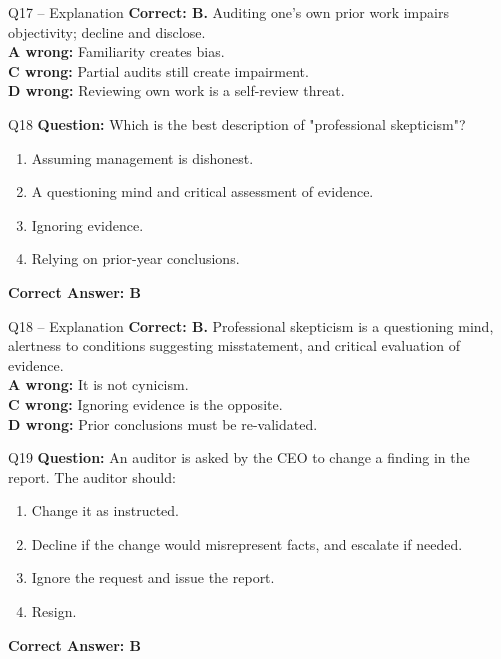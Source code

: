 \documentclass[aspectratio=169,10pt]{beamer}
\begin{document}
	\begin{frame}[t]{Q17 -- Explanation}
		\small
		\textbf{Correct: B.} Auditing one's own prior work impairs objectivity; decline and disclose. \\[4pt]
		\textbf{A wrong:} Familiarity creates bias. \\[2pt]
		\textbf{C wrong:} Partial audits still create impairment. \\[2pt]
		\textbf{D wrong:} Reviewing own work is a self-review threat.
	\end{frame}
	
	\begin{frame}[t]{Q18}
		\small
		\textbf{Question:} Which is the best description of "professional skepticism"?
		\begin{enumerate}[label=\Alph*.,itemsep=1pt,topsep=2pt]
			\item Assuming management is dishonest.
			\item A questioning mind and critical assessment of evidence.
			\item Ignoring evidence.
			\item Relying on prior-year conclusions.
		\end{enumerate}
		\vspace{4pt}
		\textbf{Correct Answer: B}
	\end{frame}
	
	\begin{frame}[t]{Q18 -- Explanation}
		\small
		\textbf{Correct: B.} Professional skepticism is a questioning mind, alertness to conditions suggesting misstatement, and critical evaluation of evidence. \\[4pt]
		\textbf{A wrong:} It is not cynicism. \\[2pt]
		\textbf{C wrong:} Ignoring evidence is the opposite. \\[2pt]
		\textbf{D wrong:} Prior conclusions must be re-validated.
	\end{frame}
	
	\begin{frame}[t]{Q19}
		\small
		\textbf{Question:} An auditor is asked by the CEO to change a finding in the report. The auditor should:
		\begin{enumerate}[label=\Alph*.,itemsep=1pt,topsep=2pt]
			\item Change it as instructed.
			\item Decline if the change would misrepresent facts, and escalate if needed.
			\item Ignore the request and issue the report.
			\item Resign.
		\end{enumerate}
		\vspace{4pt}
		\textbf{Correct Answer: B}
	\end{frame}
	
\end{document}
